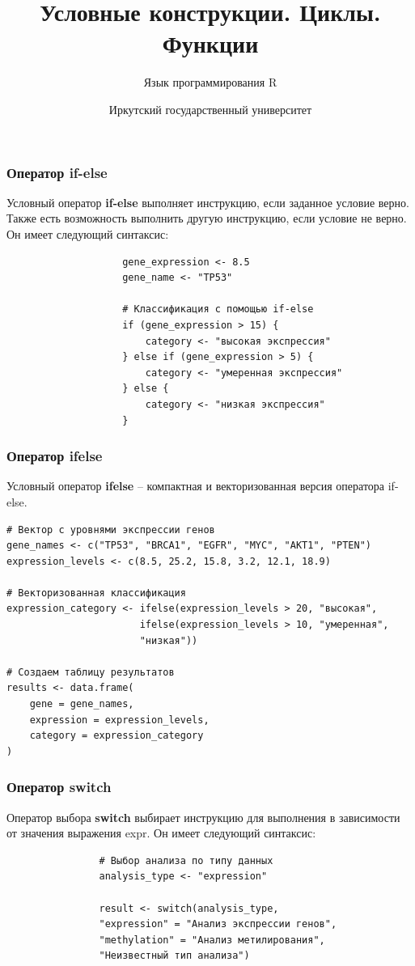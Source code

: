 \documentclass[11pt,a4paper]{beamer}
\title{Условные конструкции. Циклы. \\ Функции}
\subtitle{Язык программирования R}
\date{}
\author{Иркутский государственный университет}
\begin{document}
	
	\maketitle
	
	\begin{frame}[fragile]
		\frametitle{Оператор if-else}
		Условный оператор \textbf{if-else} выполняет инструкцию, если заданное условие верно. Также есть возможность выполнить другую инструкцию, если условие не верно. Он имеет следующий синтаксис:

			{\fontsize{10}{10}\selectfont
				\begin{verbatim}
					gene_expression <- 8.5
					gene_name <- "TP53"
					
					# Классификация с помощью if-else
					if (gene_expression > 15) {
					    category <- "высокая экспрессия"
					} else if (gene_expression > 5) {
					    category <- "умеренная экспрессия"
					} else {
					    category <- "низкая экспрессия"
					}
				\end{verbatim}
			}	
		
	\end{frame} 
	
	\begin{frame}[fragile]
		\frametitle{Оператор ifelse}
Условный оператор \textbf{ifelse} – компактная и векторизованная версия оператора if-else.
			{\fontsize{8}{10}\selectfont
				\begin{verbatim}
# Вектор с уровнями экспрессии генов
gene_names <- c("TP53", "BRCA1", "EGFR", "MYC", "AKT1", "PTEN")
expression_levels <- c(8.5, 25.2, 15.8, 3.2, 12.1, 18.9)
					
# Векторизованная классификация
expression_category <- ifelse(expression_levels > 20, "высокая",
                       ifelse(expression_levels > 10, "умеренная", 
                       "низкая"))
					
# Создаем таблицу результатов
results <- data.frame(
    gene = gene_names,
    expression = expression_levels,
    category = expression_category
)
\end{verbatim}}
\end{frame}

\begin{frame}[fragile]
	\frametitle{Оператор switch}
	Оператор выбора \textbf{switch} выбирает инструкцию для выполнения в зависимости от значения выражения expr. Он имеет следующий синтаксис: 
	
		{\footnotesize
			\begin{verbatim}
				# Выбор анализа по типу данных
				analysis_type <- "expression"
				
				result <- switch(analysis_type,
				"expression" = "Анализ экспрессии генов",
				"methylation" = "Анализ метилирования", 
				"Неизвестный тип анализа")
			\end{verbatim}
		}
	
\end{frame}
	
\end{document}
